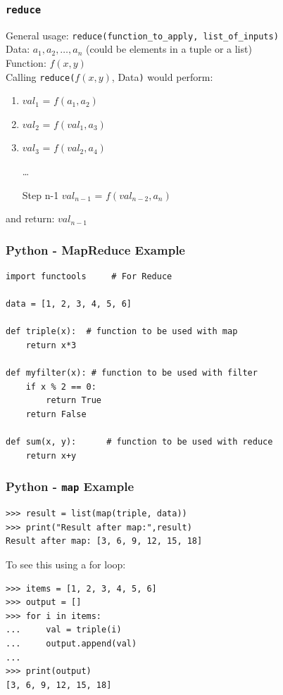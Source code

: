 \documentclass[xcolor=svgnames, handout]{beamer}
\newcommand{\ft}[1]{\frametitle{#1}}
\begin{document}
\begin{frame}[fragile]\ft{\tt reduce}
General usage: \verb|reduce(function_to_apply, list_of_inputs)|\\[1em]

Data: $a_1, a_2, \dots, a_n$ (could be elements in a tuple or a list)\\
Function: $f(x,y)$\\[1em]

Calling {\tt reduce(}$f(x,y)$, Data{\tt )} would perform:
\begin{enumerate}[Step 1:]
\item $val_1$ = $f(a_1, a_2)$
\item $val_2$ = $f(val_1, a_3)$
\item $val_3$ = $f(val_2, a_4)$
\item[] \dots
\item[Step n-1] $val_{n-1}$ = $f(val_{n-2}, a_n)$
\end{enumerate}
and return:  $val_{n-1}$

\end{frame}





\begin{frame}[fragile]\ft{Python - MapReduce Example}
\begin{Verbatim}[xleftmargin=.1in] 
import functools     # For Reduce

data = [1, 2, 3, 4, 5, 6]

def triple(x):  # function to be used with map
    return x*3

def myfilter(x): # function to be used with filter
    if x % 2 == 0:
        return True
    return False

def sum(x, y):      # function to be used with reduce
    return x+y

\end{Verbatim}
\end{frame}


\begin{frame}[fragile]\ft{Python - {\tt map} Example}
\begin{Verbatim}[xleftmargin=.1in, frame=single] 
>>> result = list(map(triple, data))
>>> print("Result after map:",result)
Result after map: [3, 6, 9, 12, 15, 18]
\end{Verbatim}
To see this using a for loop:
\begin{Verbatim}[xleftmargin=.1in, frame=single] 
>>> items = [1, 2, 3, 4, 5, 6]
>>> output = []
>>> for i in items:
...     val = triple(i)
...     output.append(val)
... 
>>> print(output) 
[3, 6, 9, 12, 15, 18]
\end{Verbatim}
\end{frame}
\end{document}
